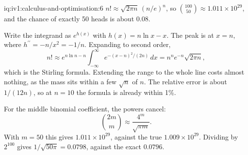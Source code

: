 \begin{solution}{iq:iv1:calculus-and-optimisation:6}
$n! \approx \sqrt{2\pi n}\,(n/e)^n$, so $\binom{100}{50} \approx 1.011 \times 10^{29}$, and the chance of exactly 50 heads is about $0.08$.

Write the integrand as $e^{h(x)}$ with $h(x) = n\ln x - x$. The peak is at $x = n$, where $h^{\prime\prime} = -n/x^2 = -1/n$. Expanding to second order,
\[
n! \approx e^{n\ln n - n}\int_{-\infty}^{\infty} e^{-(x - n)^2/(2n)}\,dx = n^n e^{-n}\sqrt{2\pi n},
\]
which is the Stirling formula. Extending the range to the whole line costs almost nothing, as the mass sits within a few $\sqrt{n}$ of $n$. The relative error is about $1/(12n)$, so at $n = 10$ the formula is already within 1\%.

For the middle binomial coefficient, the powers cancel:
\[
\binom{2m}{m} \approx \frac{4^m}{\sqrt{\pi m}}.
\]
With $m = 50$ this gives $1.011 \times 10^{29}$, against the true $1.009 \times 10^{29}$. Dividing by $2^{100}$ gives $1/\sqrt{50\pi} = 0.0798$, against the exact $0.0796$.



\end{solution}

